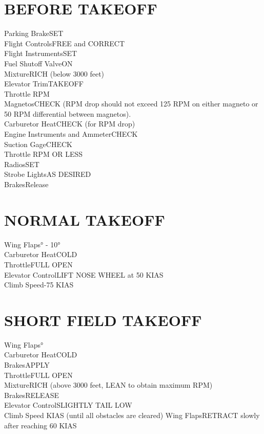 \documentclass{article}
\begin{document}
\begin{multicols*}{2}
\section*{BEFORE TAKEOFF}
Parking Brake\dotfill SET\\
Flight Controls\dotfill FREE and CORRECT\\
Flight Instruments\dotfill SET\\
Fuel Shutoff Valve\dotfill ON\\
Mixture\dotfill RICH (below 3000 feet)\\
Elevator Trim\dotfill TAKEOFF\\
Throttle RPM\\
\hspace*{6mm}Magnetos\dotfill CHECK (RPM drop should not exceed 125 RPM on either magneto or 50 RPM differential between magnetos).\\
\hspace*{6mm}Carburetor Heat\dotfill CHECK (for RPM drop)\\
\hspace*{6mm}Engine Instruments and Ammeter\dotfill CHECK\\
\hspace*{6mm}Suction Gage\dotfill CHECK\\
\hspace*{6mm}Throttle RPM OR LESS\\
Radios\dotfill SET\\
Strobe Lights\dotfill AS DESIRED\\
Brakes\dotfill Release
\section*{NORMAL TAKEOFF}
Wing Flaps° - 10°\\
Carburetor Heat\dotfill COLD\\
Throttle\dotfill FULL OPEN\\
Elevator Control\dotfill LIFT NOSE WHEEL at 50 KIAS\\
Climb Speed-75 KIAS
\vfill\null
\section*{SHORT FIELD TAKEOFF}
Wing Flaps°\\
Carburetor Heat\dotfill COLD\\
Brakes\dotfill APPLY\\
Throttle\dotfill FULL OPEN\\
Mixture\dotfill RICH (above 3000 feet, LEAN to obtain maximum RPM)\\
Brakes\dotfill RELEASE\\
Elevator Control\dotfill SLIGHTLY TAIL LOW\\
Climb Speed KIAS (until all obstacles are cleared)
Wing Flaps\dotfill RETRACT slowly after reaching 60 KIAS

\end{multicols*}
\end{document}
